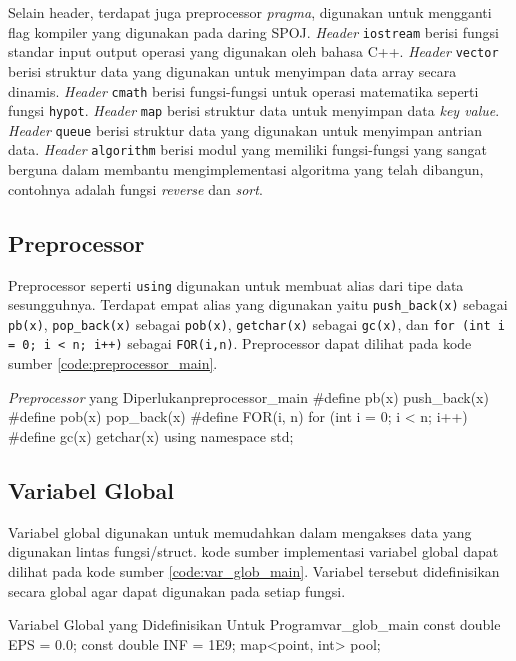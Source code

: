 Selain header, terdapat juga preprocessor \textit{pragma}, digunakan untuk mengganti flag kompiler yang digunakan pada daring SPOJ.
\textit{Header} \texttt{iostream} berisi fungsi standar input output operasi yang digunakan oleh bahasa C++. \textit{Header} \texttt{vector} berisi struktur data yang digunakan untuk menyimpan data array secara dinamis. \textit{Header} \texttt{cmath} berisi fungsi-fungsi untuk operasi matematika seperti fungsi \texttt{hypot}. \textit{Header} \texttt{map} berisi struktur data untuk menyimpan data \textit{key value}. \textit{Header} \texttt{queue} berisi struktur data yang digunakan untuk menyimpan antrian data. \textit{Header} \texttt{algorithm} berisi modul yang memiliki fungsi-fungsi yang sangat berguna dalam membantu mengimplementasi algoritma yang telah dibangun, contohnya adalah fungsi \textit{reverse} dan \textit{sort}.

\subsection{Preprocessor}
Preprocessor seperti \texttt{using} digunakan untuk membuat alias dari tipe data sesungguhnya. Terdapat empat alias yang digunakan yaitu \texttt{push\_back(x)} sebagai \texttt{pb(x)}, \texttt{pop\_back(x)} sebagai \texttt{pob(x)}, \texttt{getchar(x)} sebagai \texttt{gc(x)}, dan \texttt{for (int i = 0; i < n; i++)} sebagai \texttt{FOR(i,n)}. Preprocessor dapat dilihat pada kode sumber \ref{code:preprocessor_main}.

\newpage
\begin{code}[firstnumber=1]{\textit{Preprocessor} yang Diperlukan}{preprocessor_main}
#define pb(x) push_back(x)
#define pob(x) pop_back(x)
#define FOR(i, n) for (int i = 0; i < n; i++)
#define gc(x) getchar(x)
using namespace std;
\end{code}

\subsection{Variabel Global}
Variabel global digunakan untuk memudahkan dalam mengakses data yang digunakan lintas fungsi/struct. kode sumber implementasi variabel global dapat dilihat pada kode sumber \ref{code:var_glob_main}. Variabel tersebut didefinisikan secara global agar dapat digunakan pada setiap fungsi.

\begin{code}[firstnumber=1]{Variabel Global yang Didefinisikan Untuk Program}{var_glob_main}
const double EPS = 0.0;
const double INF = 1E9;
map<point, int> pool;
\end{code}

